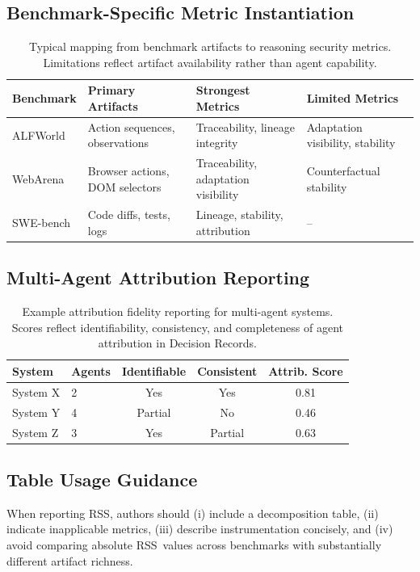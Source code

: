 \documentclass[11pt]{article}
\newcommand{\RSS}{\textsc{RSS}}
\begin{document}
\subsection{Benchmark-Specific Metric Instantiation}

\begin{table}[t]
\centering
\begin{tabular}{l l l l}
\toprule
Benchmark & Primary Artifacts & Strongest Metrics & Limited Metrics \\
\midrule
ALFWorld
& Action sequences, observations
& Traceability, lineage integrity
& Adaptation visibility, stability \\
WebArena
& Browser actions, DOM selectors
& Traceability, adaptation visibility
& Counterfactual stability \\
SWE-bench
& Code diffs, tests, logs
& Lineage, stability, attribution
& -- \\
\bottomrule
\end{tabular}
\caption{Typical mapping from benchmark artifacts to reasoning security metrics. Limitations reflect artifact availability rather than agent capability.}
\label{tab:benchmark_subscores}
\end{table}

\subsection{Multi-Agent Attribution Reporting}

\begin{table}[t]
\centering
\begin{tabular}{l l c c c}
\toprule
System & Agents & Identifiable & Consistent & Attrib. Score \\
\midrule
System X & 2 & Yes & Yes & 0.81 \\
System Y & 4 & Partial & No & 0.46 \\
System Z & 3 & Yes & Partial & 0.63 \\
\bottomrule
\end{tabular}
\caption{Example attribution fidelity reporting for multi-agent systems. Scores reflect identifiability, consistency, and completeness of agent attribution in Decision Records.}
\label{tab:attribution}
\end{table}

\subsection{Table Usage Guidance}
When reporting \RSS, authors should (i) include a decomposition table, (ii) indicate inapplicable metrics, (iii) describe instrumentation concisely, and (iv) avoid comparing absolute \RSS\ values across benchmarks with substantially different artifact richness.
\end{document}
